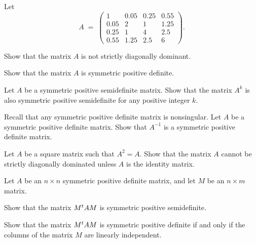 \begin{exercises}
\item Let
\[
A \;=\;
\begin{pmatrix}
1 & 0.05 & 0.25 & 0.55\\
0.05 & 2 & 1 & 1.25\\
0.25 & 1 & 4 & 2.5\\
0.55 & 1.25 & 2.5 & 6
\end{pmatrix}.
\]
\begin{subparts}
\item Show that the matrix $A$ is not strictly diagonally dominant.
\item Show that the matrix $A$ is symmetric positive definite.
\end{subparts}

\item Let $A$ be a symmetric positive semidefinite matrix. Show that the matrix
$A^k$ is also symmetric positive semidefinite for any positive integer $k$.

\item Recall that any symmetric positive definite matrix is nonsingular. Let $A$ be
a symmetric positive definite matrix. Show that $A^{-1}$ is a symmetric positive
definite matrix.

\item Let $A$ be a square matrix such that $A^2 = A$. Show that the matrix $A$
cannot be strictly diagonally dominated unless $A$ is the identity matrix.

\item Let $A$ be an $n \times n$ symmetric positive definite matrix, and let $M$ be
an $n \times m$ matrix.
\begin{subparts}
\item Show that the matrix $M^{t} AM$ is symmetric positive semidefinite.
\item Show that the matrix $M^{t} AM$ is symmetric positive definite if and only if
the columns of the matrix $M$ are linearly independent.
\end{subparts}

\end{exercises}

